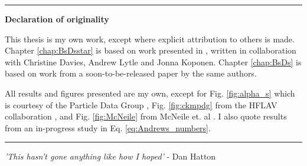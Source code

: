 \begin{titlepage}
\begin{vcenterpage}
\noindent\rule[2pt]{\textwidth}{0.5pt}
\begin{center}
{\large\textbf{Declaration of originality}}
\end{center}
This thesis is my own work, except where explicit attribution to others is made. Chapter \ref{chap:BsDsstar} is based on work presented in \cite{McLean:2019sds}, written in collaboration with Christine Davies, Andrew Lytle and Jonna Koponen. Chapter \ref{chap:BsDs} is based on work from a soon-to-be-released paper by the same authors.

All results and figures presented are my own, except for Fig. \ref{fig:alpha_s} which is courtesy of the Particle Data Group \cite{PhysRevD.98.030001}, Fig. \ref{fig:ckmpdg} from the HFLAV collaboration \cite{HFLAV16}, and Fig. \ref{fig:McNeile} from McNeile et. al \cite{McNeile:2012qf}. I also quote results from an in-progress study \cite{Colquhoun:2016osw} in Eq. \eqref{eq:Andrews_numbers}.
    
\noindent\rule[2pt]{\textwidth}{0.5pt}
\end{vcenterpage}

\cleardoublepage

\thispagestyle{empty}

\begin{center}
  \emph{'This hasn't gone anything like how I hoped'} - Dan Hatton
\end{center}


\end{titlepage}
\sloppy

\titlepage
